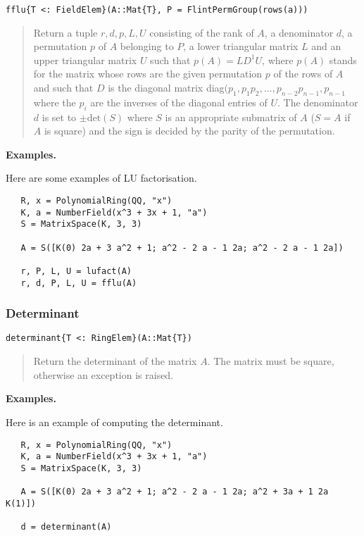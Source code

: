 \documentclass[a4paper,10pt]{article}
\newcommand{\desc}[1]{\vspace{-3mm}\begin{quote}#1\end{quote}}
\begin{document}
\begin{lstlisting}
fflu{T <: FieldElem}(A::Mat{T}, P = FlintPermGroup(rows(a)))
\end{lstlisting}

\desc{Return a tuple $r, d, p, L, U$ consisting of the rank of $A$, a
denominator $d$, a permutation $p$ of $A$ belonging to $P$, a lower triangular
matrix $L$ and an upper triangular matrix $U$ such that $p(A) = LD^1U$, where
$p(A)$ stands for the matrix whose rows are the given permutation $p$ of the
rows of $A$ and such that $D$ is the diagonal matrix
diag$(p_1, p_1p_2, \ldots, p_{n-2}p_{n-1}, p_{n-1}$ where the $p_i$ are the
inverses of the diagonal entries of $U$. The denominator $d$ is set to
$\pm \mbox{det}(S)$ where $S$ is an appropriate submatrix of $A$ ($S = A$ if
$A$ is square) and the sign is decided by the parity of the permutation.}

\textbf{Examples.}

Here are some examples of LU factorisation.

\begin{lstlisting}
   R, x = PolynomialRing(QQ, "x")
   K, a = NumberField(x^3 + 3x + 1, "a")
   S = MatrixSpace(K, 3, 3)
   
   A = S([K(0) 2a + 3 a^2 + 1; a^2 - 2 a - 1 2a; a^2 - 2 a - 1 2a])

   r, P, L, U = lufact(A)
   r, d, P, L, U = fflu(A)
\end{lstlisting}

\subsubsection{Determinant}

\begin{lstlisting}
determinant{T <: RingElem}(A::Mat{T})
\end{lstlisting}

\desc{Return the determinant of the matrix $A$. The matrix must be square,
otherwise an exception is raised.}

\textbf{Examples.}

Here is an example of computing the determinant.

\begin{lstlisting}
   R, x = PolynomialRing(QQ, "x")
   K, a = NumberField(x^3 + 3x + 1, "a")
   S = MatrixSpace(K, 3, 3)
   
   A = S([K(0) 2a + 3 a^2 + 1; a^2 - 2 a - 1 2a; a^2 + 3a + 1 2a K(1)])

   d = determinant(A)
\end{lstlisting}
\end{document}
